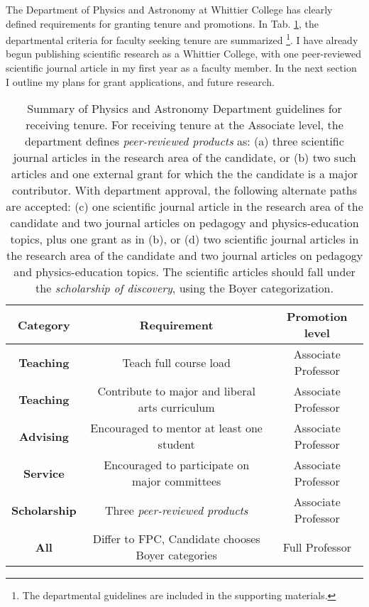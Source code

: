 \documentclass[../../main.tex]{subfiles}
\begin{document}
The Department of Physics and Astronomy at Whittier College has clearly defined requirements for granting tenure and promotions.  In Tab. \ref{tab:tenure}, the departmental criteria for faculty seeking tenure are summarized \footnote{The departmental guidelines are included in the supporting materials.}.  I have already begun publishing scientific research as a Whittier College, with one peer-reviewed scientific journal article in my first year as a faculty member.  In the next section I outline my plans for grant applications, and future research.

\begin{table}
\centering
\begin{tabular}{|c|c|c|}
\hline \hline
Category & Requirement & Promotion level \\ \hline
\textbf{Teaching} & Teach full course load & Associate Professor \\ \hline
\textbf{Teaching} & Contribute to major and liberal arts curriculum & Associate Professor \\ \hline
\textbf{Advising} & Encouraged to mentor at least one student & Associate Professor \\ \hline
\textbf{Service} & Encouraged to participate on major committees & Associate Professor \\ \hline
\textbf{Scholarship} & Three \textit{peer-reviewed products} & Associate Professor \\ \hline \hline
\textbf{All} & Differ to FPC, Candidate chooses Boyer categories & Full Professor \\ \hline
\end{tabular}
\caption{\label{tab:tenure} Summary of Physics and Astronomy Department guidelines for receiving tenure.  For receiving tenure at the Associate level, the department defines \textit{peer-reviewed products} as: (a) three scientific journal articles in the research area of the candidate, or (b) two such articles and one external grant for which the the candidate is a major contributor.  With department approval, the following alternate paths are accepted: (c) one scientific journal article in the research area of the candidate and two journal articles on pedagogy and physics-education topics, plus one grant as in (b), or (d) two scientific journal articles in the research area of the candidate and two journal articles on pedagogy and physics-education topics.  The scientific articles should fall under the \textit{scholarship of discovery}, using the Boyer categorization.}
\end{table}
\end{document}

